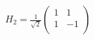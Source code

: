 \documentclass[preview]{standalone}
\begin{document}
\begin{align*}
H_2 = \frac{1}{\sqrt{2}} \left({\begin{array}{cc} 1 & 1 \\ 1 & -1 \\ \end{array}} \right)
\end{align*}
\end{document}
